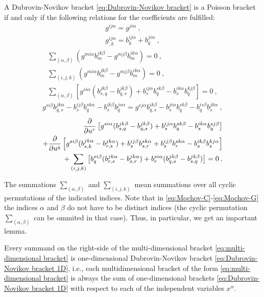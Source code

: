 \begin{theorem}
    A Dubrovin-Novikov bracket \eqref{eq:Dubrovin-Novikov bracket} is a Poisson bracket if and only if the following relations for the coefficients are fulfilled:
    \begin{align}
        g^{ij \alpha} = g^{ji \alpha} \:, \label{eq:Mochov-A} \\
        g^{ij \alpha}_{,k} = b^{ij \alpha}_k + b^{ji \alpha}_k \:, \label{eq:Mochov-B}
    \end{align}
    \begin{align}
        \sum_{(\alpha, \beta)} (g^{mi \alpha} b^{jk \beta}_m - g^{m j \beta} b^{i k \alpha}_m) = 0 \:, \label{eq:Mochov-C}\\
        \sum_{(i,j,k)} (g^{mi \alpha} b^{jk \beta}_m - g^{m j \beta} b^{ik \alpha}_m) = 0 \:, \label{eq:Mochov-D}\\
        \sum_{(\alpha, \beta)} \left[ g^{si \alpha} (b^{jk \beta}_{s,q} - b^{jk \beta}_{q,s} ) + b^{ij \alpha}_s b^{s k \beta}_q - b^{i k \alpha}_s b^{k j \beta}_q \right] = 0 \label{eq:Mochov-E}\:,
    \end{align}
    \begin{align}
        g^{si \beta} b^{j k \alpha}_{q,s} - b^{ij \beta}_s b^{s k \alpha}_q - b^{i k \beta}_s b^{j s \alpha}_q = g^{s j \alpha} b^{i k \beta}_{q,s} - b^{ji \alpha}_s b^{s k \beta}_q - b^{is \beta}_q b^{jk \alpha}_s \label{eq:Mochov-F}\:,
    \end{align}
    \begin{align}
        \frac{\partial }{\partial u^r} \left[ g^{si \alpha} (b^{j k \beta}_{s,q} - b^{j k \beta}_{q,s}) + b^{ij \alpha}_s b^{s k \beta}_q - b^{i k \alpha}_s b^{s j \beta}_q \right] 
        \nonumber \\+ \frac{\partial }{\partial u^q} \left[ g^{si \beta} (b^{j k  \alpha}_{s,k} - b^{j k \alpha}_{r,s}) + b^{ij \beta}_s b^{s k \alpha}_{s,r} + b^{ij \beta}_s b^{s k \alpha}_r - b^{i k \beta}_s b^{k j \alpha}_s \right] \label{eq:Mochov-G}
        \\+ \sum_{(i,j,k)} \left[ b^{si \beta}_q (b^{j k \alpha}_{r,s} - b^{j k \alpha}_{s,r}) + b^{s i \alpha}_r (b^{j k \beta}_{q,s} - b^{j k \beta}_{s,q}) \right] \nonumber
        = 0 \:.
    \end{align}
\end{theorem}
The summations $\sum_{(\alpha, \beta)}$ and $\sum_{(i,j,k)}$ mean summations over all cyclic permutations of the indicated indices. Note that in \eqref{eq:Mochov-C}-\eqref{eq:Mochov-G} the indices $\alpha$ and $\beta$ do not have to be distinct indices (the cyclic permutation $\sum_{(\alpha, \beta)}$ can be ommited in that case). Thus, in particular, we get an important lemma.
\begin{lemma}
    Every summand on the right-side of the multi-dimensional bracket \eqref{eq:multi-dimensional bracket} is one-dimensional Dubrovin-Novikov bracket \eqref{eq:Dubrovin-Novikov bracket 1D}, i.e., each multidimensional bracket of the form \eqref{eq:multi-dimensional bracket} is always the sum of one-dimensional brackets \eqref{eq:Dubrovin-Novikov bracket 1D} with respect to each of the independent variables $x^\alpha$.
\end{lemma}


